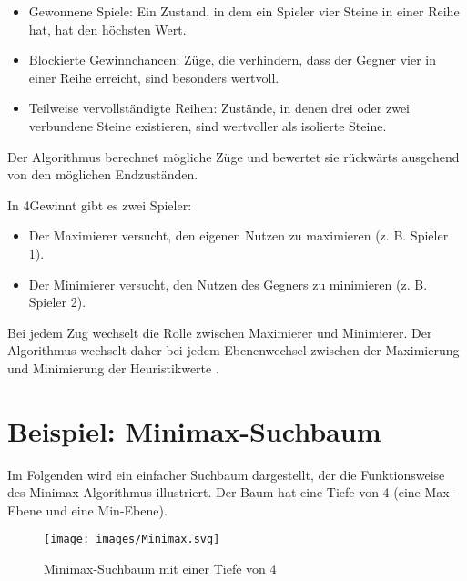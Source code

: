 \begin{itemize}
	\item Gewonnene Spiele: Ein Zustand, in dem ein Spieler vier Steine in einer Reihe hat, hat den höchsten Wert.
	\item Blockierte Gewinnchancen: Züge, die verhindern, dass der Gegner vier in einer Reihe erreicht, sind besonders wertvoll.
	\item Teilweise vervollständigte Reihen: Zustände, in denen drei oder zwei verbundene Steine existieren, sind wertvoller als isolierte Steine.
\end{itemize}

Der Algorithmus berechnet mögliche Züge und bewertet sie rückwärts ausgehend von den möglichen Endzuständen.

In 4Gewinnt gibt es zwei Spieler:

\begin{itemize}
	\item Der Maximierer versucht, den eigenen Nutzen zu maximieren (z. B. Spieler 1).
	\item Der Minimierer versucht, den Nutzen des Gegners zu minimieren (z. B. Spieler 2).
\end{itemize}

Bei jedem Zug wechselt die Rolle zwischen Maximierer und Minimierer. Der Algorithmus wechselt daher bei jedem Ebenenwechsel zwischen der Maximierung und Minimierung der Heuristikwerte \autocites{krusenotto_anwendungsbeispiel_2016}.

\section*{Beispiel: Minimax-Suchbaum}

Im Folgenden wird ein einfacher Suchbaum dargestellt, der die Funktionsweise des Minimax-Algorithmus illustriert. Der Baum hat eine Tiefe von 4 (eine Max-Ebene und eine Min-Ebene).

\begin{figure}[H]
	\centering
	\texttt{[image: images/Minimax.svg]}
	\caption[Minimax-Suchbaum: \cite{Wikipedia:Minimax}]{Minimax-Suchbaum mit einer Tiefe von 4}
	\label{fig:minimax}
\end{figure}



